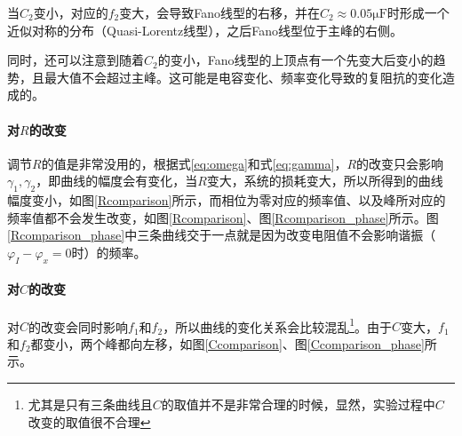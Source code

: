 \documentclass{ctexart}
\begin{document}
	当$C_2$变小，对应的$f_2$变大，会导致Fano线型的右移，并在$C_2\approx0.05\mathrm{\mu F}$时形成一个近似对称的分布（Quasi-Lorentz线型），之后Fano线型位于主峰的右侧。
	
	同时，还可以注意到随着$C_2$的变小，Fano线型的上顶点有一个先变大后变小的趋势，且最大值不会超过主峰。这可能是电容变化、频率变化导致的复阻抗的变化造成的。
	\paragraph{对$R$的改变}
	调节$R$的值是非常没用的，根据式\ref{eq:omega}和式\ref{eq:gamma}，$R$的改变只会影响$\gamma_1,\gamma_2$，即曲线的幅度会有变化，当$R$变大，系统的损耗变大，所以所得到的曲线幅度变小，如图\ref{Rcomparison}所示，而相位为零对应的频率值、以及峰所对应的频率值都不会发生改变，如图\ref{Rcomparison}、图\ref{Rcomparison_phase}所示。图\ref{Rcomparison_phase}中三条曲线交于一点就是因为改变电阻值不会影响谐振（$\varphi_I-\varphi_x=0$时）的频率。
	\paragraph{对$C$的改变}
	对$C$的改变会同时影响$f_1$和$f_2$，所以曲线的变化关系会比较混乱\footnote{尤其是只有三条曲线且$C$的取值并不是非常合理的时候，显然，实验过程中$C$改变的取值很不合理}。由于$C$变大，$f_1$和$f_2$都变小，两个峰都向左移，如图\ref{Ccomparison}、图\ref{Ccomparison_phase}所示。
\end{document}
